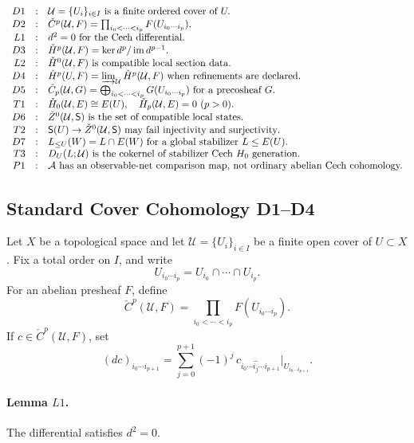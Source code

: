 \[
\begin{array}{rcl}
D1&:&\mathcal U=\{U_i\}_{i\in I}\text{ is a finite ordered cover of }U.\\
D2&:&\check C^p(\mathcal U,F)=
      \prod_{i_0<\cdots<i_p}F(U_{i_0\cdots i_p}).\\
L1&:&d^2=0\text{ for the Cech differential}.\\
D3&:&\check H^p(\mathcal U,F)=\ker d^p/\operatorname{im}d^{p-1}.\\
L2&:&\check H^0(\mathcal U,F)\text{ is compatible local section data}.\\
D4&:&\check H^p(U,F)=\varinjlim_{\mathcal U}\check H^p(\mathcal U,F)
      \text{ when refinements are declared}.\\
D5&:&\check C_p(\mathcal U,G)=
      \bigoplus_{i_0<\cdots<i_p}G(U_{i_0\cdots i_p})
      \text{ for a precosheaf }G.\\
T1&:&\check H_0(\mathcal U,E)\cong E(U),\quad
      \check H_p(\mathcal U,E)=0\ (p>0).\\
D6&:&\check Z^0(\mathcal U,\mathsf S)
      \text{ is the set of compatible local states}.\\
T2&:&\mathsf S(U)\to\check Z^0(\mathcal U,\mathsf S)
      \text{ may fail injectivity and surjectivity}.\\
D7&:&L_{\leq U}(W)=L\cap E(W)\text{ for a global stabilizer }L\leq E(U).\\
T3&:&D_U(L;\mathcal U)\text{ is the cokernel of stabilizer Cech }H_0
      \text{ generation}.\\
P1&:&\mathcal A\text{ has an observable-net comparison map, not ordinary
      abelian Cech cohomology.}
\end{array}
\]

\subsection{Standard Cover Cohomology D1--D4}

Let \(X\) be a topological space and let
\(\mathcal U=\{U_i\}_{i\in I}\) be a finite open cover of \(U\subset X\).
Fix a total order on \(I\), and write
\[
  U_{i_0\cdots i_p}=U_{i_0}\cap\cdots\cap U_{i_p}.
\]
For an abelian presheaf \(F\), define
\[
  \check C^p(\mathcal U,F)=
  \prod_{i_0<\cdots<i_p}F(U_{i_0\cdots i_p}).
\]
If \(c\in\check C^p(\mathcal U,F)\), set
\[
  (dc)_{i_0\cdots i_{p+1}}
  =
  \sum_{j=0}^{p+1}(-1)^j\,
  c_{i_0\cdots \widehat{i_j}\cdots i_{p+1}}
  \big|_{U_{i_0\cdots i_{p+1}}}.
\]

\paragraph{Lemma \(L1\).}
The differential satisfies \(d^2=0\).

